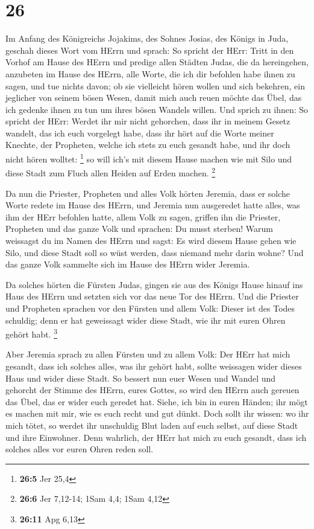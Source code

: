 \hypertarget{section-5}{%
\section{26}\label{section-5}}

 Im Anfang des Königreichs Jojakims, des Sohnes Josias, des
Königs in Juda, geschah dieses Wort vom HErrn und sprach: 
So spricht der HErr: Tritt in den Vorhof am Hause des HErrn und predige
allen Städten Judas, die da hereingehen, anzubeten im Hause des HErrn,
alle Worte, die ich dir befohlen habe ihnen zu sagen, und tue nichts
davon;  ob sie vielleicht hören wollen und sich bekehren,
ein jeglicher von seinem bösen Wesen, damit mich auch reuen möchte das
Übel, das ich gedenke ihnen zu tun um ihres bösen Wandels willen.
 Und sprich zu ihnen: So spricht der HErr: Werdet ihr mir
nicht gehorchen, dass ihr in meinem Gesetz wandelt, das ich euch
vorgelegt habe,  dass ihr hört auf die Worte meiner Knechte,
der Propheten, welche ich stets zu euch gesandt habe, und ihr doch nicht
hören wolltet: \footnote{\textbf{26:5} Jer 25,4}  so will
ich's mit diesem Hause machen wie mit Silo und diese Stadt zum Fluch
allen Heiden auf Erden machen. \footnote{\textbf{26:6} Jer 7,12-14; 1Sam
  4,4; 1Sam 4,12}

 Da nun die Priester, Propheten und alles Volk hörten
Jeremia, dass er solche Worte redete im Hause des HErrn, 
und Jeremia nun ausgeredet hatte alles, was ihm der HErr befohlen hatte,
allem Volk zu sagen, griffen ihn die Priester, Propheten und das ganze
Volk und sprachen: Du musst sterben!  Warum weissagst du im
Namen des HErrn und sagst: Es wird diesem Hause gehen wie Silo, und
diese Stadt soll so wüst werden, dass niemand mehr darin wohne? Und das
ganze Volk sammelte sich im Hause des HErrn wider Jeremia.

 Da solches hörten die Fürsten Judas, gingen sie aus des
Königs Hause hinauf ins Haus des HErrn und setzten sich vor das neue Tor
des HErrn.  Und die Priester und Propheten sprachen vor den
Fürsten und allem Volk: Dieser ist des Todes schuldig; denn er hat
geweissagt wider diese Stadt, wie ihr mit euren Ohren gehört habt.
\footnote{\textbf{26:11} Apg 6,13}

 Aber Jeremia sprach zu allen Fürsten und zu allem Volk:
Der HErr hat mich gesandt, dass ich solches alles, was ihr gehört habt,
sollte weissagen wider dieses Haus und wider diese Stadt. 
So bessert nun euer Wesen und Wandel und gehorcht der Stimme des HErrn,
eures Gottes, so wird den HErrn auch gereuen das Übel, das er wider euch
geredet hat.  Siehe, ich bin in euren Händen; ihr mögt es
machen mit mir, wie es euch recht und gut dünkt.  Doch
sollt ihr wissen: wo ihr mich tötet, so werdet ihr unschuldig Blut laden
auf euch selbst, auf diese Stadt und ihre Einwohner. Denn wahrlich, der
HErr hat mich zu euch gesandt, dass ich solches alles vor euren Ohren
reden soll.

